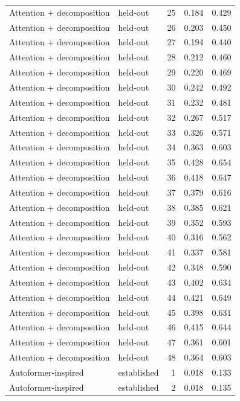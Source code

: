 \begin{tabular}{llrrr}
Attention + decomposition & held-out & 25 & 0.184 & 0.429 \\
Attention + decomposition & held-out & 26 & 0.203 & 0.450 \\
Attention + decomposition & held-out & 27 & 0.194 & 0.440 \\
Attention + decomposition & held-out & 28 & 0.212 & 0.460 \\
Attention + decomposition & held-out & 29 & 0.220 & 0.469 \\
Attention + decomposition & held-out & 30 & 0.242 & 0.492 \\
Attention + decomposition & held-out & 31 & 0.232 & 0.481 \\
Attention + decomposition & held-out & 32 & 0.267 & 0.517 \\
Attention + decomposition & held-out & 33 & 0.326 & 0.571 \\
Attention + decomposition & held-out & 34 & 0.363 & 0.603 \\
Attention + decomposition & held-out & 35 & 0.428 & 0.654 \\
Attention + decomposition & held-out & 36 & 0.418 & 0.647 \\
Attention + decomposition & held-out & 37 & 0.379 & 0.616 \\
Attention + decomposition & held-out & 38 & 0.385 & 0.621 \\
Attention + decomposition & held-out & 39 & 0.352 & 0.593 \\
Attention + decomposition & held-out & 40 & 0.316 & 0.562 \\
Attention + decomposition & held-out & 41 & 0.337 & 0.581 \\
Attention + decomposition & held-out & 42 & 0.348 & 0.590 \\
Attention + decomposition & held-out & 43 & 0.402 & 0.634 \\
Attention + decomposition & held-out & 44 & 0.421 & 0.649 \\
Attention + decomposition & held-out & 45 & 0.398 & 0.631 \\
Attention + decomposition & held-out & 46 & 0.415 & 0.644 \\
Attention + decomposition & held-out & 47 & 0.361 & 0.601 \\
Attention + decomposition & held-out & 48 & 0.364 & 0.603 \\
Autoformer-inspired & established & 1 & 0.018 & 0.133 \\
Autoformer-inspired & established & 2 & 0.018 & 0.135 \\

\end{tabular}
